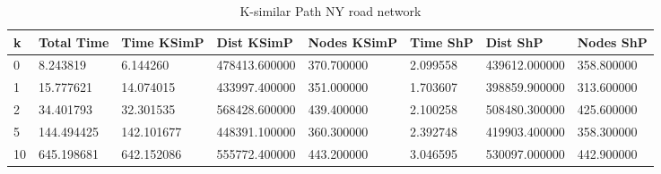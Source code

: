\documentclass[]{article}
\numberwithin{equation}{section}
\begin{document}
\begin{appendices}
\begin{table}[H]
	\centering
	\small
	\setlength\tabcolsep{2pt}
	\begin{tabular}{|l|l|l|l|l|l|l|l|}
		\hline
		k  & Total Time & Time KSimP & Dist KSimP    & Nodes KSimP & Time ShP & Dist ShP      & Nodes ShP  \\ \hline
		0  & 8.243819   & 6.144260   & 478413.600000 & 370.700000  & 2.099558 & 439612.000000 & 358.800000 \\ \hline
		1  & 15.777621  & 14.074015  & 433997.400000 & 351.000000  & 1.703607 & 398859.900000 & 313.600000 \\ \hline
		2  & 34.401793  & 32.301535  & 568428.600000 & 439.400000  & 2.100258 & 508480.300000 & 425.600000 \\ \hline
		5  & 144.494425 & 142.101677 & 448391.100000 & 360.300000  & 2.392748 & 419903.400000 & 358.300000 \\ \hline
		10 & 645.198681 & 642.152086 & 555772.400000 & 443.200000  & 3.046595 & 530097.000000 & 442.900000 \\ \hline
	\end{tabular}
	\caption{K-similar Path NY road network}
\end{table}

\end{appendices}
\end{document}
